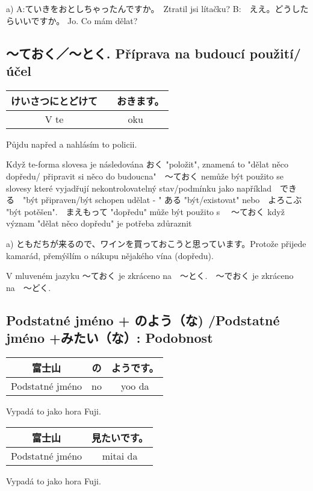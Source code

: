 a) 
A:ていきをおとしちゃったんですか。　Ztratil jsi lítačku? 
B:　ええ。どうしたらいいですか。 Jo. Co mám dělat?


\subsection{〜ておく／〜とく. Příprava na budoucí použití/účel}

\begin{center}
\begin{tabular}{||c|c||}
\hline
けいさつにとどけて &　おきます。\\
\hline
V te & oku\\
\hline
\end{tabular}
\end{center}
 Půjdu napřed a nahlásím to policii.
 
 Když te-forma slovesa je následována おく "položit", znamená to  "dělat něco dopředu/ připravit si něco do budoucna"　〜ておく nemůže být použito se slovesy které vyjadřují nekontrolovatelný stav/podmínku jako například　できる　"být připraven/být schopen udělat - " ある "být/existovat" nebo　よろこぶ "být potěšen".　まえもって "dopředu" může být použito s 　〜ておく když význam "dělat něco dopředu" je potřeba zdůraznit
 
a)  ともだちが来るので、ワインを買っておこうと思っています。Protože přijede kamarád, přemýšlím o nákupu nějakého vína (dopředu).

V mluveném jazyku 〜ておく je zkráceno na　〜とく.　〜でおく je zkráceno na　〜どく.




\subsection{Podstatné jméno + のよう（な) /Podstatné jméno +みたい（な）: Podobnost}

\begin{center}
\begin{tabular}{||c|c|c||}
\hline
富士山&の&ようです。\\
\hline
Podstatné jméno&no&yoo da\\
\hline
\end{tabular}
\end{center}
Vypadá to jako hora Fuji.


\begin{center}
\begin{tabular}{||c|c||}
\hline
富士山&見たいです。\\
\hline
Podstatné jméno&mitai da\\
\hline
\end{tabular}
\end{center}
Vypadá to jako hora Fuji.


